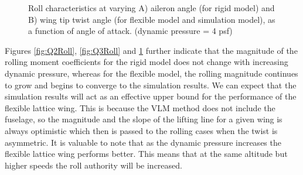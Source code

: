 \documentclass[11pt]{ucthesis}
\begin{document}
\begin{figure}[thpb]
\hfill
{}
\hfill
{}
\hfill
\caption{Roll characteristics at varying A) aileron angle (for rigid model) and B) wing tip twist angle (for flexible model and simulation model), as a function of angle of attack. (dynamic pressure = 4 psf)}
\label{fig:Q4Roll}
\end{figure}

Figures \ref{fig:Q2Roll}, \ref{fig:Q3Roll} and \ref{fig:Q4Roll} further indicate that the magnitude of the rolling moment coefficients for the rigid model does not change with increasing dynamic pressure, whereas for the flexible model, the rolling magnitude continues to grow and begins to converge to the simulation results. We can expect that the simulation results will act as an effective upper bound for the performance of the flexible lattice wing. This is because the VLM method does not include the fuselage, so the magnitude and the slope of the lifting line for a given wing is always optimistic which then is passed to the rolling cases when the twist is asymmetric. It is valuable to note that as the dynamic pressure increases the flexible lattice wing performs better. This means that at the same altitude but higher speeds the roll authority will be increased.
\end{document}

